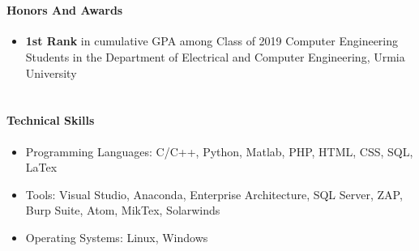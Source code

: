 \documentclass[12pt]{article}
\begin{document}
\paragraph{\\Honors And Awards}
\begin{itemize}
	\item \textbf{1st Rank} in cumulative GPA among Class of 2019 Computer Engineering Students in the Department of Electrical and Computer Engineering, Urmia University
\end{itemize}

\paragraph{\\Technical Skills}
\begin{itemize}
	\item Programming Languages: C/C++, Python, Matlab, PHP, HTML, CSS, SQL, LaTex
	\item Tools: Visual Studio, Anaconda, Enterprise Architecture, SQL Server, ZAP, Burp Suite, Atom, MikTex, Solarwinds
	\item Operating Systems: Linux, Windows
\end{itemize}
\end{document}
